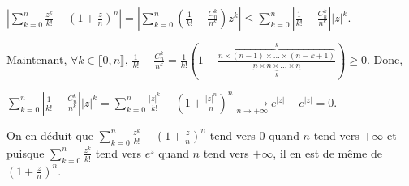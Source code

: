 {{\begin{center}
$\left|\sum_{k=0}^{n} \frac{z^k}{k!}-\left(1+ \frac{z}{n}\right)^n\right| =\left|\sum_{k=0}^{n}\left( \frac{1}{k!}- \frac{C_n^k}{n^k}\right)z^k\right|\leqslant\sum_{k=0}^{n}\left| \frac{1}{k!}- \frac{C_n^k}{n^k}\right||z|^k $.
\end{center}

Maintenant, $\forall k\in\llbracket0,n\rrbracket$, $ \frac{1}{k!}- \frac{C_n^k}{n^k}= \frac{1}{k!}\left(1-  \frac{\overbrace{n\times(n-1)\times\ldots\times(n-k+1)}^{k}}{\underbrace{n\times n\times\ldots\times n}_{k}}\right)\geqslant 0$. Donc,

\begin{center}
$\sum_{k=0}^{n}\left| \frac{1}{k!}- \frac{C_n^k}{n^k}\right||z|^k=\sum_{k=0}^{n} \frac{|z|^k}{k!}-\left(1+ \frac{|z|^n}{n}\right)^n\underset{n\rightarrow+\infty}{\rightarrow}e^{|z|}-e^{|z|}= 0$.
\end{center}

On en déduit que $\sum_{k=0}^{n} \frac{z^k}{k!}-\left(1+ \frac{z}{n}\right)^n$ tend vers $0$ quand $n$ tend vers $+\infty$ et puisque $\sum_{k=0}^{n} \frac{z^k}{k!}$ tend vers $e^z$ quand $n$ tend vers $+\infty$, il en est de même de $\left(1+ \frac{z}{n}\right)^n$.
}
}
